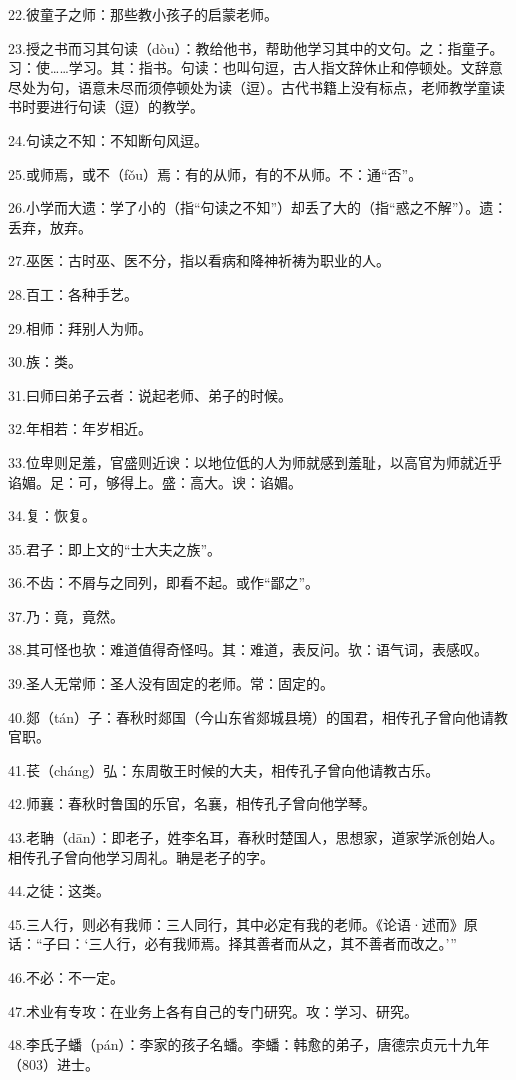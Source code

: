 \documentclass[letterpaper,12pt,english]{sphinxmanual}
\begin{document}
22.彼童子之师：那些教小孩子的启蒙老师。

23.授之书而习其句读（dòu）：教给他书，帮助他学习其中的文句。之：指童子。习：使……学习。其：指书。句读：也叫句逗，古人指文辞休止和停顿处。文辞意尽处为句，语意未尽而须停顿处为读（逗）。古代书籍上没有标点，老师教学童读书时要进行句读（逗）的教学。

24.句读之不知：不知断句风逗。

25.或师焉，或不（fǒu）焉：有的从师，有的不从师。不：通“否”。

26.小学而大遗：学了小的（指“句读之不知”）却丢了大的（指“惑之不解”）。遗：丢弃，放弃。

27.巫医：古时巫、医不分，指以看病和降神祈祷为职业的人。

28.百工：各种手艺。

29.相师：拜别人为师。

30.族：类。

31.曰师曰弟子云者：说起老师、弟子的时候。

32.年相若：年岁相近。

33.位卑则足羞，官盛则近谀：以地位低的人为师就感到羞耻，以高官为师就近乎谄媚。足：可，够得上。盛：高大。谀：谄媚。

34.复：恢复。

35.君子：即上文的“士大夫之族”。

36.不齿：不屑与之同列，即看不起。或作“鄙之”。

37.乃：竟，竟然。

38.其可怪也欤：难道值得奇怪吗。其：难道，表反问。欤：语气词，表感叹。

39.圣人无常师：圣人没有固定的老师。常：固定的。

40.郯（tán）子：春秋时郯国（今山东省郯城县境）的国君，相传孔子曾向他请教官职。

41.苌（cháng）弘：东周敬王时候的大夫，相传孔子曾向他请教古乐。

42.师襄：春秋时鲁国的乐官，名襄，相传孔子曾向他学琴。

43.老聃（dān）：即老子，姓李名耳，春秋时楚国人，思想家，道家学派创始人。相传孔子曾向他学习周礼。聃是老子的字。

44.之徒：这类。

45.三人行，则必有我师：三人同行，其中必定有我的老师。《论语·述而》原话：“子曰：‘三人行，必有我师焉。择其善者而从之，其不善者而改之。’”

46.不必：不一定。

47.术业有专攻：在业务上各有自己的专门研究。攻：学习、研究。

48.李氏子蟠（pán）：李家的孩子名蟠。李蟠：韩愈的弟子，唐德宗贞元十九年（803）进士。
\end{document}
